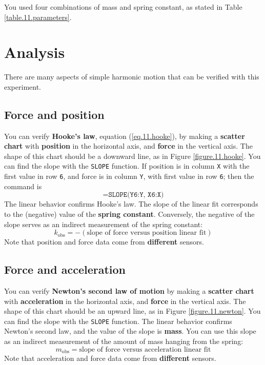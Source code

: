You used four combinations of mass and spring constant, as stated in Table \ref{table.11.parameters}.
%
\section{Analysis}
%
There are many aspects of simple harmonic motion that can be verified with this experiment.
%
\subsection{Force and position}
%
You can verify \textbf{Hooke's law}, equation (\ref{eq.11.hooke}), by making a \textbf{scatter chart} with \textbf{position} in the horizontal axis, and \textbf{force} in the vertical axis. The shape of this chart should be a downward line, as in Figure \ref{figure.11.hooke}. You can find the slope with the \texttt{SLOPE} function. If position is in column \texttt{X} with the first value in row \texttt{6}, and force is in column \texttt{Y}, with first value in row \texttt{6}; then the command is
\begin{equation}
    \texttt{=SLOPE(Y6:Y, X6:X)}
\end{equation}
The linear behavior confirms Hooke's law. The slope of the linear fit corresponds to the (negative) value of the \textbf{spring constant}. Conversely, the negative of the slope serves as an indirect measurement of the spring constant:
\begin{equation}
    k_{\text{obs}} = - (\text{slope of force versus position linear fit})
\end{equation}
Note that position and force data come from \textbf{different} sensors.
%
\subsection{Force and acceleration}
%
You can verify \textbf{Newton's second law of motion} by making a \textbf{scatter chart} with \textbf{acceleration} in the horizontal axis, and \textbf{force} in the vertical axis. The shape of this chart should be an upward line, as in Figure \ref{figure.11.newton}. You can find the slope with the \texttt{SLOPE} function. The linear behavior confirms Newton's second law, and the value of the slope is \textbf{mass}. You can use this slope as an indirect measurement of the amount of mass hanging from the spring:
\begin{equation}
    m_{\text{obs}} = \text{slope of force versus acceleration linear fit}
\end{equation}
Note that acceleration and force data come from \textbf{different} sensors.


